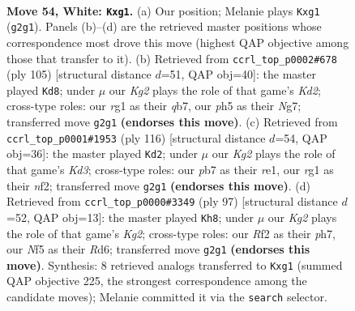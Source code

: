 \documentclass[11pt]{article}
\begin{document}
\clearpage

\begin{figure}[p]\centering
\begin{subfigure}{0.46\textwidth}\centering
\resizebox{\linewidth}{!}{%
\newchessgame
\chessboard[
  setfen={5nk1/1p2Q2p/8/5N1p/8/8/5RK1/6r1 w - - 3 54},
  showmover=false,
  pgfstyle=straightmove, color=movearrow, markmove={g2-g1}
]}
\caption{}
\end{subfigure}\hfill
\begin{subfigure}{0.46\textwidth}\centering
\resizebox{\linewidth}{!}{%
\newchessgame
\chessboard[
  setfen={6r1/1Q1k2n1/4q3/8/1p6/3P3P/2P4K/5R2 b - - 20 53},
  showmover=false,
  pgfstyle=straightmove, color=movearrow, markmove={d7-d8}
]}
\caption{}
\end{subfigure}
\\[4pt]
\begin{subfigure}{0.46\textwidth}\centering
\resizebox{\linewidth}{!}{%
\newchessgame
\chessboard[
  setfen={8/4k3/4p3/4N2R/6pP/3K2P1/5n2/4r3 w - - 0 59},
  showmover=false,
  pgfstyle=straightmove, color=movearrow, markmove={d3-d2}
]}
\caption{}
\end{subfigure}\hfill
\begin{subfigure}{0.46\textwidth}\centering
\resizebox{\linewidth}{!}{%
\newchessgame
\chessboard[
  setfen={8/R5kP/3r4/6p1/B5P1/8/6K1/3q4 b - - 1 49},
  showmover=false,
  pgfstyle=straightmove, color=movearrow, markmove={g7-h8}
]}
\caption{}
\end{subfigure}
\caption{\textbf{Move 54, White: \texttt{Kxg1}.} (a) Our position; Melanie plays \texttt{Kxg1} (\texttt{g2g1}). Panels (b)--(d) are the retrieved master positions whose correspondence most drove this move (highest QAP objective among those that transfer to it). (b) Retrieved from \texttt{ccrl\_top\_p0002\#678} (ply 105) [structural distance $d$=51, QAP obj=40]: the master played \texttt{Kd8}; under $\mu$ our \emph{Kg2} plays the role of that game's \emph{Kd2}; cross-type roles: our \emph{r}g1 as their \emph{q}b7, our \emph{p}h5 as their \emph{N}g7; transferred move \texttt{g2g1} \textbf{(endorses this move)}. (c) Retrieved from \texttt{ccrl\_top\_p0001\#1953} (ply 116) [structural distance $d$=54, QAP obj=36]: the master played \texttt{Kd2}; under $\mu$ our \emph{Kg2} plays the role of that game's \emph{Kd3}; cross-type roles: our \emph{p}b7 as their \emph{r}e1, our \emph{r}g1 as their \emph{n}f2; transferred move \texttt{g2g1} \textbf{(endorses this move)}. (d) Retrieved from \texttt{ccrl\_top\_p0000\#3349} (ply 97) [structural distance $d$=52, QAP obj=13]: the master played \texttt{Kh8}; under $\mu$ our \emph{Kg2} plays the role of that game's \emph{Kg2}; cross-type roles: our \emph{R}f2 as their \emph{p}h7, our \emph{N}f5 as their \emph{R}d6; transferred move \texttt{g2g1} \textbf{(endorses this move)}. Synthesis: 8 retrieved analogs transferred to \texttt{Kxg1} (summed QAP objective 225, the strongest correspondence among the candidate moves); Melanie committed it via the \texttt{search} selector.}
\label{fig:thought-m106}
\end{figure}
\end{document}
